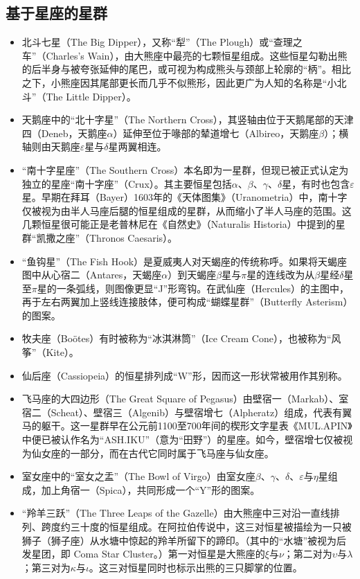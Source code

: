 \subsection{基于星座的星群}
\begin{itemize}
\item 北斗七星（The Big Dipper），又称“犁”（The Plough）或“查理之车”（Charles’s Wain），由大熊座中最亮的七颗恒星组成。这些恒星勾勒出熊的后半身与被夸张延伸的尾巴，或可视为构成熊头与颈部上轮廓的“柄”。相比之下，小熊座因其尾部更长而几乎不似熊形，因此更广为人知的名称是“小北斗”（The Little Dipper）。
\item 天鹅座中的“北十字星”（The Northern Cross），其竖轴由位于天鹅尾部的天津四（Deneb，天鹅座$\alpha$）延伸至位于喙部的辇道增七（Albireo，天鹅座$\beta$）；横轴则由天鹅座$\varepsilon$星与$\delta$星两翼相连。
\item “南十字星座”（The Southern Cross）本名即为一星群，但现已被正式认定为独立的星座“南十字座”（Crux）。其主要恒星包括$\alpha$、$\beta$、$\gamma$、$\delta$星，有时也包含$\varepsilon$星。早期在拜耳（Bayer）1603年的《天体图集》（Uranometria）中，南十字仅被视为由半人马座后腿的恒星组成的星群，从而缩小了半人马座的范围。这几颗恒星很可能正是老普林尼在《自然史》（Naturalis Historia）中提到的星群“凯撒之座”（Thronos Caesaris）。
\item “鱼钩星”（The Fish Hook）是夏威夷人对天蝎座的传统称呼。如果将天蝎座图中从心宿二（Antares，天蝎座$\alpha$）到天蝎座$\beta$星与$\pi$星的连线改为从$\beta$星经$\delta$星至$\pi$星的一条弧线，则图像更显“J”形弯钩。在武仙座（Hercules）的主图中，再于左右两翼加上竖线连接肢体，便可构成“蝴蝶星群”（Butterfly Asterism）的图案。
\item 牧夫座（Boötes）有时被称为“冰淇淋筒”（Ice Cream Cone），也被称为“风筝”（Kite）。
\item 仙后座（Cassiopeia）的恒星排列成“W”形，因而这一形状常被用作其别称。
\item 飞马座的大四边形（The Great Square of Pegasus）由壁宿一（Markab）、室宿二（Scheat）、壁宿三（Algenib）与壁宿增七（Alpheratz）组成，代表有翼马的躯干。这一星群早在公元前1100至700年间的楔形文字星表《MUL.APIN》中便已被认作名为“ASH.IKU”（意为“田野”）的星座。如今，壁宿增七仅被视为仙女座的一部分，而在古代它同时属于飞马座与仙女座。
\item 室女座中的“室女之盂”（The Bowl of Virgo）由室女座$\beta$、$\gamma$、$\delta$、$\varepsilon$与$\eta$星组成，加上角宿一（Spica），共同形成一个“Y”形的图案。
\item “羚羊三跃”（The Three Leaps of the Gazelle）由大熊座中三对沿一直线排列、跨度约三十度的恒星组成。在阿拉伯传说中，这三对恒星被描绘为一只被狮子（狮子座）从水塘中惊起的羚羊所留下的蹄印。（其中的“水塘”被视为后发星团，即 Coma Star Cluster。）第一对恒星是大熊座的$\xi$与$\nu$；第二对为$\upsilon$与$\lambda$；第三对为$\kappa$与$\iota$。这三对恒星同时也标示出熊的三只脚掌的位置。
\end{itemize}
